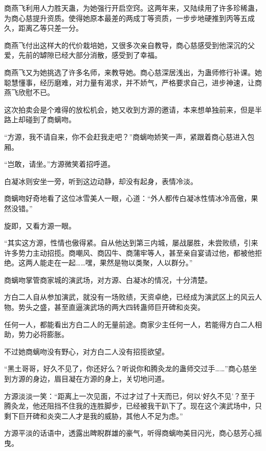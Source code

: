 \begin{this_body}
商燕飞利用人力胜天蛊，为她强行开启空窍。这两年来，又陆续用了许多珍稀蛊，为商心慈提升资质。使得她原本最差的两成丁等资质，一步步地硬推到丙等五成久，距离乙等只差一分。

商燕飞付出这样大的代价栽培她，又很多次亲自教导，商心慈感受到他深沉的父爱，先前的罅隙已经大部分消散，感受到了幸福。

商燕飞又为她挑选了许多名师，来教导她。商心慈深居浅出，为蛊师修行补课。她聪慧懂事，经历磨难，对力量有渴求，并不娇气，严格要求自己，进步神速，让商燕飞欣慰不已。

这次拍卖会是个难得的放松机会，她又收到方源的邀请，本来想单独前来，但是半路上却碰到了商螭吻。

“方源，我不请自来，你不会赶我走吧？”商螭吻娇笑一声，紧跟着商心慈进入包厢。

“岂敢，请坐。”方源微笑着招呼道。

白凝冰则安坐一旁，听到这边动静，却没有起身，表情冷淡。

商螭吻好奇地看了这位冰雪美人一眼，心道：“外人都传白凝冰性情冰冷高傲，果然没错。”

旋即，又看方源一眼。

“其实这方源，性情也傲得紧。自从他达到第三内城，屡战屡胜，未尝败绩，引来许多势力主动招揽。商嘲风、商囚牛、商蒲牢等人，甚至亲自宴请过他，都被他拒绝。这两人能走在一起……嘿，果然是物以类聚，人以群分。”

商螭吻掌管商家城的演武场，对方源、白凝冰的情况，十分清楚。

方白二人自从参加演武，就没有一场败绩，天资卓绝，已经成为演武区上的风云人物。势头之盛，甚至直逼演武场的两大四转蛊师巨开碑和炎突。

任何一人，都能看出方白二人的无量前途。商家少主任何一人，若能得方白二人相助，势力必将膨胀。

不过她商螭吻没有野心，对方白二人没有招揽欲望。

“黑土哥哥，好久不见了，你还好么？听说你和腾灸龙的蛊师交过手……”商心慈坐到方源的身边，眉目凝在方源的身上，关切地问道。

方源淡淡一笑：“距离上一次见面，不过才过了十天而已，何以‘好久不见’？至于腾灸龙，他还阻挡不住我的连胜脚步，已经被我干趴下了。现在这个演武场中，只剩下巨开碑和炎突二人才是我的威胁，其他人不足为虑。”

方源平淡的话语中，透露出睥睨群雄的豪气，听得商螭吻美目闪光，商心慈芳心摇曳。

\end{this_body}

